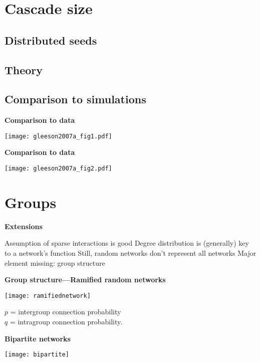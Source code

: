 \section{Cascade size}


\subsection{Distributed seeds}

  
  

\subsection{Theory}

  
  


\subsection{Comparison to simulations}

  \textbf{Comparison to data}

      
    \texttt{[image: gleeson2007a\_fig1.pdf]}
    
  
  \textbf{Comparison to data}

      
    \texttt{[image: gleeson2007a\_fig2.pdf]}
    
  
\section{Groups}

  \textbf{Extensions}

  
   Assumption of sparse interactions is good
   Degree distribution is (generally) key to a network's function
   Still, random networks don't represent all networks
   Major element missing: \alert{group structure}
  


  \textbf{Group structure---Ramified random networks}
 
   \centering
   \texttt{[image: ramifiednetwork]}
 
   $p$ = intergroup connection probability\\
   $q$ = intragroup connection probability.
 

  \textbf{Bipartite networks}
 
   \centering
   \texttt{[image: bipartite]}
 
